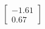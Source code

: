 \documentclass[preview]{standalone}
\begin{document}
\begin{align*}
\begin{bmatrix} -1.61 \\ 0.67 \end{bmatrix}
\end{align*}
\end{document}
